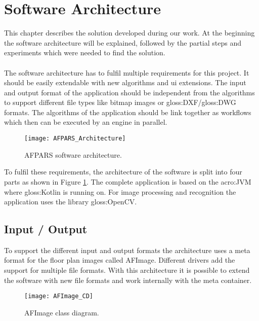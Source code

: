 \section{Software Architecture}
This chapter describes the solution developed during our work. At the beginning the software architecture will be explained, followed by the partial steps and experiments which were needed to find the solution.
\\\\
The software architecture has to fulfil multiple requirements for this project. It should be easily extendable with new algorithms and ui extensions. The input and output format of the application should be independent from the algorithms to support different file types like bitmap images or \gls{gloss:DXF}/\gls{gloss:DWG} formats. The algorithms of the application should be link together as workflows which then can be executed by an engine in parallel.

\begin{figure}[h]
  \centering
      \texttt{[image: AFPARS\_Architecture]}
  \caption{AFPARS software architecture.}
  \label{fig:AFPARS_Architecture}
\end{figure}


To fulfil these requirements, the architecture of the software is split into four parts as shown in Figure \ref{fig:AFPARS_Architecture}. The complete application is based on the \acrfull{acro:JVM} where \gls{gloss:Kotlin} is running on. For image processing and recognition the application uses the library \gls{gloss:OpenCV}.


\pagebreak

\subsection{Input / Output}
To support the different input and output formats the architecture uses a meta format for the
floor plan images called AFImage. Different drivers add the support for multiple file formats. With this architecture it is possible to extend the software with new file formats and work internally with the meta container.

\begin{figure}[h]
  \centering
      \texttt{[image: AFImage\_CD]}
  \caption{AFImage class diagram.}
  \label{fig:AFImage_CD}
\end{figure}

